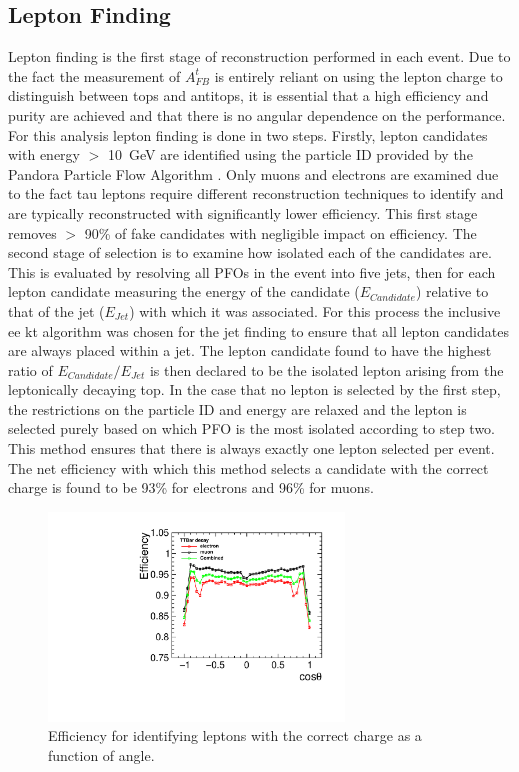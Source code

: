 \subsection{Lepton Finding}
\label{sec:lepfinding}
Lepton finding is the first stage of reconstruction performed in each event. Due to the fact the measurement of $A_{FB}^{t}$ is entirely reliant on using the lepton charge to distinguish between tops and antitops, it is essential that a high efficiency and purity are achieved and that there is no angular dependence on the performance. For this analysis lepton finding is done in two steps. Firstly, lepton candidates with energy $>$ 10~GeV are identified using the particle ID provided by the Pandora Particle Flow Algorithm \cite{Thomson200925}. Only muons and electrons are examined due to the fact tau leptons require different reconstruction techniques to identify and are typically reconstructed with significantly lower efficiency. This first stage removes $>$ 90\% of fake candidates with negligible impact on efficiency. The second stage of selection is to examine how isolated each of the candidates are. This is evaluated by resolving all PFOs in the event into five jets, then for each lepton candidate measuring the energy of the candidate ($E_{Candidate}$) relative to that of the jet ($E_{Jet}$) with which it was associated. For this process the inclusive ee kt algorithm was chosen for the jet finding to ensure that all lepton candidates are always placed within a jet. The lepton candidate found to have the highest ratio of $E_{Candidate}/E_{Jet}$ is then declared to be the isolated lepton arising from the leptonically decaying top. In the case that no lepton is selected by the first step, the restrictions on the particle ID and energy are relaxed and the lepton is selected purely based on which PFO is the most isolated according to step two. This method ensures that there is always exactly one lepton selected per event. The net efficiency with which this method selects a candidate with the correct charge is found to be 93\% for electrons and 96\% for muons.

\begin{figure}
  \centering
  \includegraphics[width=0.7\textwidth]{TopAnalysis/figures/NetEfficiencys.pdf}
  \caption[Efficiency for identifying leptons with the correct charge as a function of angle.]{Efficiency for identifying leptons with the correct charge as a function of angle.}
  \label{fig:netefficiency}
\end{figure}


